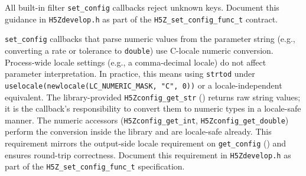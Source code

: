 \documentclass[../RFC-HDFG-2026-001.tex]{subfiles}
\begin{document}
All built-in filter \texttt{set\_config} callbacks reject unknown keys.  Document
this guidance in \texttt{H5Zdevelop.h} as part of the
\texttt{H5Z\_set\_config\_func\_t} contract.

\texttt{set\_config} callbacks that parse numeric values from the parameter
string (e.g., converting a rate or tolerance to \texttt{double}) use
C-locale numeric conversion. Process-wide locale settings (e.g., a
comma-decimal locale) do not affect parameter interpretation. In practice,
this means using \texttt{strtod} under \texttt{uselocale(newlocale(LC\_NUMERIC\_MASK,
"C", 0))} or a locale-independent equivalent. The library-provided
\texttt{H5Zconfig\_get\_str} () returns raw
string values; it is the callback's responsibility to convert them to numeric
types in a locale-safe manner.  The numeric accessors
(\texttt{H5Zconfig\_get\_int}, \texttt{H5Zconfig\_get\_double}) perform the
conversion inside the library and are locale-safe already. This requirement mirrors the output-side locale
requirement on \texttt{get\_config} () and ensures
round-trip correctness. Document this requirement in
\texttt{H5Zdevelop.h} as part of the \texttt{H5Z\_set\_config\_func\_t} specification.

\end{document}
